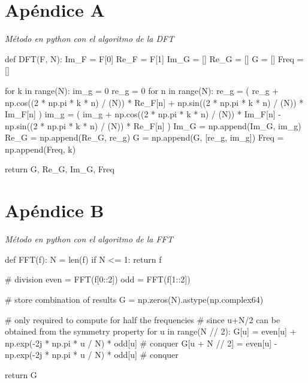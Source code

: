 \newpage
\onecolumn

\section*{Apéndice A}
\label{ApendiceA}

\emph{Método en python con el algoritmo de la DFT}

\begin{python}
    def DFT(F, N):
    Im_F = F[0]
    Re_F = F[1]
    Im_G = []
    Re_G = []
    G = []
    Freq = []

    for k in range(N):
    im_g = 0
    re_g = 0
    for n in range(N):
    re_g = (
    re_g
    + np.cos((2 * np.pi * k * n) / (N)) * Re_F[n]
    + np.sin((2 * np.pi * k * n) / (N)) * Im_F[n]
    )
    im_g = (
    im_g
    + np.cos((2 * np.pi * k * n) / (N)) * Im_F[n]
    - np.sin((2 * np.pi * k * n) / (N)) * Re_F[n]
    )
    Im_G = np.append(Im_G, im_g)
    Re_G = np.append(Re_G, re_g)
    G = np.append(G, [re_g, im_g])
    Freq = np.append(Freq, k)

    return G, Re_G, Im_G, Freq
\end{python}



\section*{Apéndice B}
\label{ApendiceB}

\emph{Método en python con el algoritmo de la FFT}

\begin{python}
    def FFT(f):
    N = len(f)
    if N <= 1:
    return f

    # division
    even = FFT(f[0::2])
    odd = FFT(f[1::2])

    # store combination of results
    G = np.zeros(N).astype(np.complex64)

    # only required to compute for half the frequencies
    # since u+N/2 can be obtained from the symmetry property
    for u in range(N // 2):
    G[u] = even[u] + np.exp(-2j * np.pi * u / N) * odd[u]  # conquer
    G[u + N // 2] = even[u] - np.exp(-2j * np.pi * u / N) * odd[u]  # conquer

    return G
\end{python}